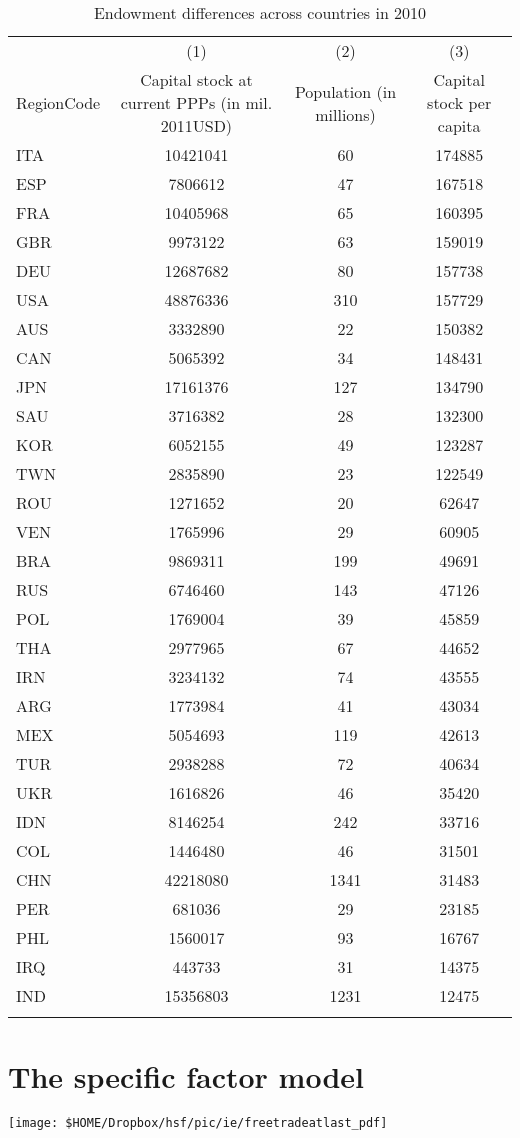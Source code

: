 \pbn
{}
	
	\begin{table}[H] \centering%
		\caption{Endowment differences across countries in 2010}%
		{\tiny
			\begin{tabularx}{\textwidth}{lCCC}
				\toprule
				&(1)&(2)&(3) \tabularnewline
				RegionCode&Capital stock at current PPPs (in mil. 2011USD)&Population (in millions)&Capital stock per capita \tabularnewline
				\midrule\addlinespace[1.5ex]
				ITA&10421041&60&174885 \tabularnewline
				ESP&7806612&47&167518 \tabularnewline
				FRA&10405968&65&160395 \tabularnewline
				GBR&9973122&63&159019 \tabularnewline
				DEU&12687682&80&157738 \tabularnewline
				USA&48876336&310&157729 \tabularnewline
				AUS&3332890&22&150382 \tabularnewline
				CAN&5065392&34&148431 \tabularnewline
				JPN&17161376&127&134790 \tabularnewline
				SAU&3716382&28&132300 \tabularnewline
				KOR&6052155&49&123287 \tabularnewline
				TWN&2835890&23&122549 \tabularnewline
				ROU&1271652&20&62647 \tabularnewline
				VEN&1765996&29&60905 \tabularnewline
				BRA&9869311&199&49691 \tabularnewline
				RUS&6746460&143&47126 \tabularnewline
				POL&1769004&39&45859 \tabularnewline
				THA&2977965&67&44652 \tabularnewline
				IRN&3234132&74&43555 \tabularnewline
				ARG&1773984&41&43034 \tabularnewline
				MEX&5054693&119&42613 \tabularnewline
				TUR&2938288&72&40634 \tabularnewline
				UKR&1616826&46&35420 \tabularnewline
				IDN&8146254&242&33716 \tabularnewline
				COL&1446480&46&31501 \tabularnewline
				CHN&42218080&1341&31483 \tabularnewline
				PER&681036&29&23185 \tabularnewline
				PHL&1560017&93&16767 \tabularnewline
				IRQ&443733&31&14375 \tabularnewline
				IND&15356803&1231&12475 \tabularnewline
				\bottomrule \addlinespace[1.5ex]
			\end{tabularx}%
		}
		\label{tab:endow}%
	\end{table}%
	
	
	\pbn
	\section{The specific factor model}\label{sec:specific}
	
	\begin{center}
		\texttt{[image: \$HOME/Dropbox/hsf/pic/ie/freetradeatlast\_pdf]}
	\end{center}
	
